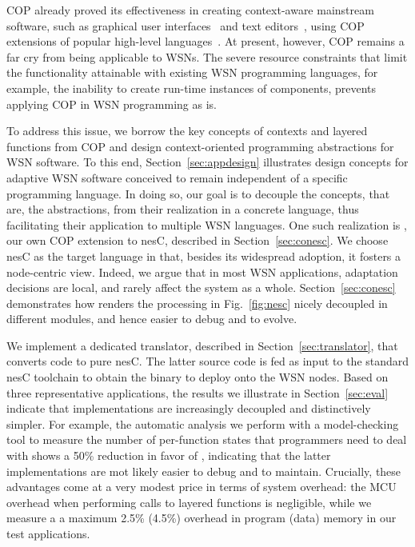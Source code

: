 COP already proved its effectiveness in creating context-aware
mainstream software, such as graphical user interfaces~\cite{Keays03}
and text editors~\cite{Kamina11}, using COP extensions of popular
high-level languages~\cite{Salvaneschi12}. At present, however, COP
remains a far cry from being applicable to WSNs. The severe resource
constraints that limit the functionality attainable with existing WSN
programming languages, for example, the inability to create run-time
instances of components, prevents applying COP in WSN programming as
is.

To address this issue, we borrow the key concepts of contexts and
layered functions from COP and design context-oriented programming
abstractions for WSN software. To this end,
Section~\ref{sec:appdesign} illustrates design concepts for adaptive
WSN software conceived to remain independent of a specific programming
language. In doing so, our goal is to decouple the concepts, that are,
the abstractions, from their realization in a concrete language, thus
facilitating their application to multiple WSN languages. One such
realization is \conesc, our own COP extension to nesC, described in
Section~\ref{sec:conesc}. We choose nesC as the target language in
that, besides its widespread adoption, it fosters a node-centric
view. Indeed, we argue that in most WSN applications, adaptation
decisions are local, and rarely affect the system as a
whole. Section~\ref{sec:conesc} demonstrates how \conesc renders the
processing in Fig.~\ref{fig:nesc} nicely decoupled in different
modules, and hence easier to debug and to evolve.

We implement a dedicated translator, described in
Section~\ref{sec:translator}, that converts \conesc code to pure
nesC. The latter source code is fed as input to the standard nesC
toolchain to obtain the binary to deploy onto the WSN nodes. Based on
three representative applications, the results we illustrate in
Section~\ref{sec:eval} indicate that \conesc implementations are
increasingly decoupled and distinctively simpler. For example, the
automatic analysis we perform with a model-checking tool to measure
the number of per-function states that programmers need to deal with
shows a 50\% reduction in favor of \conesc, indicating that the latter
implementations are mot likely easier to debug and to
maintain. Crucially, these advantages come at a very modest price in
terms of system overhead: the MCU overhead when performing calls to
layered functions is negligible, while we measure a a maximum 2.5\%
(4.5\%) overhead in program (data) memory in our test applications.

